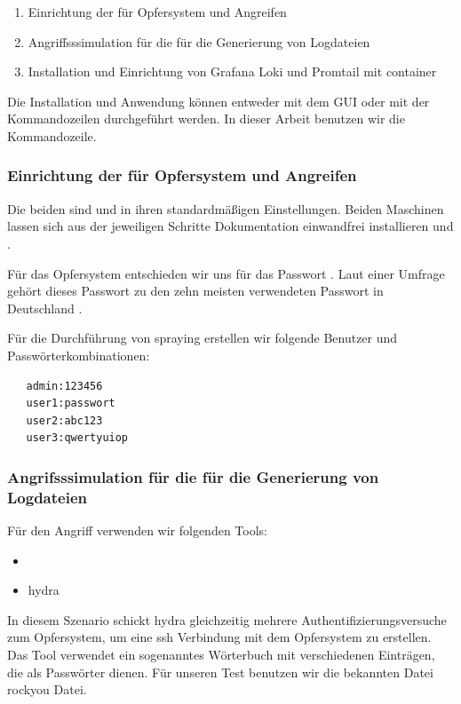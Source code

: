 \begin{enumerate}[noitemsep]
   \item	Einrichtung der  für Opfersystem und Angreifen
   \item	Angriffsssimulation für die für die Generierung von Logdateien
   \item Installation und Einrichtung von Grafana Loki und Promtail mit \gls{container}
\end{enumerate}

Die Installation und Anwendung können entweder mit dem \gls{GUI} oder mit der Kommandozeilen durchgeführt werden. In dieser Arbeit benutzen wir die Kommandozeile. 

\subsubsection{Einrichtung der  für Opfersystem und Angreifen}
Die beiden  sind  und  in ihren standardmäßigen Einstellungen. Beiden Maschinen lassen sich aus der jeweiligen Schritte Dokumentation einwandfrei installieren \citep{kali_vm} und \citep{Ubuntu_server}.

Für das Opfersystem entschieden wir uns für das Passwort . Laut einer Umfrage gehört dieses Passwort zu den zehn meisten verwendeten Passwort in Deutschland \citep{silicon_passwort}.  

Für die Durchführung von \gls{spraying} erstellen wir folgende Benutzer und Passwörterkombinationen:
{
\begin{verbatim}
   admin:123456
   user1:passwort
   user2:abc123
   user3:qwertyuiop
\end{verbatim}
}

\subsubsection{Angrifsssimulation für die für die Generierung von Logdateien}
Für den Angriff verwenden wir folgenden Tools:
\begin{itemize}[noitemsep]
   \item	{}
   \item \gls{hydra}
\end{itemize}

In diesem Szenario schickt \gls{hydra} gleichzeitig mehrere Authentifizierungsversuche zum Opfersystem, um eine \gls{ssh} Verbindung mit dem Opfersystem zu erstellen. Das Tool verwendet ein sogenanntes Wörterbuch mit verschiedenen Einträgen, die als Passwörter dienen. Für unseren Test benutzen wir die bekannten Datei \gls{rockyou} Datei. 

